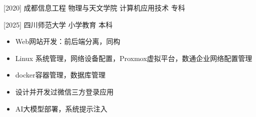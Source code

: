 \documentclass[zh]{resume}
\begin{document}
\makeheader


\begin{competences}
\end{competences}

\begin{educations}
  \education%
    {}%
    [2020]%
    {成都信息工程}%
    {物理与天文学院}%
    {计算机应用技术}%
    {专科}

  \separator{0.5ex}
  \education%
    {}%
    [2025]%
    {四川师范大学}%
    {小学教育}%
    {本科}
\end{educations}

\begin{itemize}
  \item Web网站开发：前后端分离，同构
  \item Linux 系统管理，网络设备配置，Proxmox虚拟平台，数通企业网络配置管理
  \item docker容器管理，数据库管理
  \item 设计并开发过微信三方登录应用
  \item AI大模型部署，系统提示注入
\end{itemize}
\end{document}
